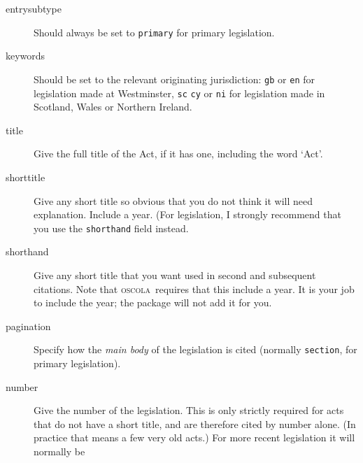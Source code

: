 \documentclass[a4paper,
               11pt,
	       DIV=1,			   
	       footinclude=false]
	      {scrartcl}
\newcommand{\oscolashort}{\textsc{oscola}\nocite{oscola}}
\begin{document}
\begin{description}
\item[entrysubtype] Should always be set to \texttt{primary} for
  primary legislation.
\item[keywords]
Should be set to the relevant originating jurisdiction:
  \texttt{gb} or \texttt{en} for legislation made at Westminster,
  \texttt{sc} \texttt{cy} or \texttt{ni} for legislation made in
  Scotland, Wales or Northern Ireland.
\item[title]
  Give the full title of the Act, if it has one, including
  the word `Act'.
\item[shorttitle]
Give any short title so obvious that you do not
  think it will need explanation. Include a year. (For legislation, I
  strongly recommend that you use the \texttt{shorthand} field
  instead.
\item[shorthand]
Give any short title that you want used in second and
  subsequent citations. Note that \oscolashort\ requires that this
  include a year. It is your job to include the
  year; the package will not add it for you.
\item[pagination]
Specify how the \emph{main body} of the legislation
  is cited (normally \texttt{section}, for primary legislation).
\item[number]
 Give the number of the legislation. This is only
  strictly required for acts that do not have a short title, and are
  therefore cited by number alone. (In practice that means a few very
  old acts.) For more recent legislation it will normally be

\end{description}
\end{document}
